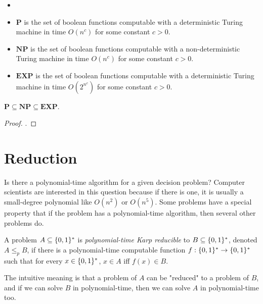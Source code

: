     \begin{defn}[P, NP, EXP] \label{def_comp_p}
        \begin{itemize}
            \item []
            \item $\mathbf{P}$ is the set of boolean functions computable with a deterministic Turing machine in time $O(n^c)$ for some constant $c>0$.
            \item $\mathbf{NP}$ is the set of boolean functions computable with a non-deterministic Turing machine in time $O(n^c)$ for some constant $c>0$.
            \item $\mathbf{EXP}$ is the set of boolean functions computable with a deterministic Turing machine in time $O(2^{n^c})$ for some constant $c>0$.
        \end{itemize}
    \end{defn}
        
    \begin{thm} \label{thm_pnpexp}
        $\mathbf{P} \subseteq \mathbf{NP} \subseteq \mathbf{EXP}$.
    \end{thm}
        
    \begin{proof}
        .
    \end{proof}
    
    \section {Reduction}
    Is there a polynomial-time algorithm for a given decision problem? Computer scientists are interested in this question because if there is one, it is usually a small-degree polynomial like $O(n^2)$ or $O(n^5)$. Some problems have a special property that if the problem has a polynomial-time algorithm, then several other problems do.
        
    \begin{defn} \label{def_poly_karp}
        A problem $A \subseteq \{0,1\}^\ast$ is \emph{polynomial-time Karp reducible} to $B \subseteq \{0,1\}^\ast$, denoted $A \leq_p B$, if there is a polynomial-time computable function $f: \{0,1\}^\ast \rightarrow \{0,1\}^\ast$ such that for every $x \in \{0,1\}^\ast$, $x \in A$ iff $f(x) \in B$.
    \end{defn}
        
    The intuitive meaning is that a problem of $A$ can be "reduced" to a problem of $B$, and if we can solve $B$ in polynomial-time, then we can solve $A$ in polynomial-time too.
        
